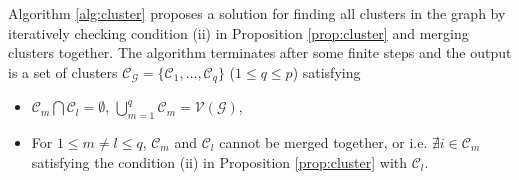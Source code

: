 \documentclass[draftclsnofoot,11pt,onecolumn]{IEEEtran}
\newcommand{\m}[1]{\mathbf{#1}}
\newcommand{\mc}[1]{\mathcal{#1}}
\begin{document}
Algorithm \ref{alg:cluster} proposes a solution for finding all clusters in the graph by iteratively checking condition (ii) in Proposition \ref{prop:cluster} and merging clusters together. The algorithm terminates after some finite steps and the output is a set of clusters $\mc{C}_{\mc{G}} = \{ \mc{C}_1, \ldots, \mc{C}_q \}$ ($1 \leq q \leq p$) satisfying
 \begin{itemize}
\item $\mc{C}_m \bigcap \mc{C}_l = \emptyset$, $\bigcup_{m=1}^q \mc{C}_m = \mc{V}(\mc{G})$,
\item For $1 \leq m \neq l \leq q$, $\mc{C}_m$ and $\mc{C}_l$ cannot be merged together, or i.e. $\nexists i \in \mc{C}_m$ satisfying the condition (ii) in Proposition \ref{prop:cluster} with $\mc{C}_l$.
\end{itemize}
\end{document}
